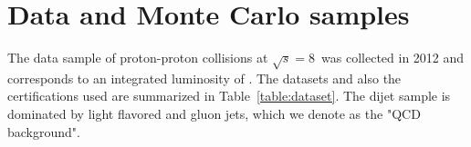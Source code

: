\newpage
%



\section{Data and Monte Carlo samples}
\label{sec:data_and_mc_samples}


The data sample of proton-proton collisions at $\sqrt{s}=8$~\TeVcc was collected in 2012 and corresponds to
an integrated luminosity of \intlumi.
The datasets and also the certifications
used are summarized in Table~\ref{table:dataset}. 
The dijet sample is dominated by light flavored and gluon jets, which we denote as 
the "QCD background".  

